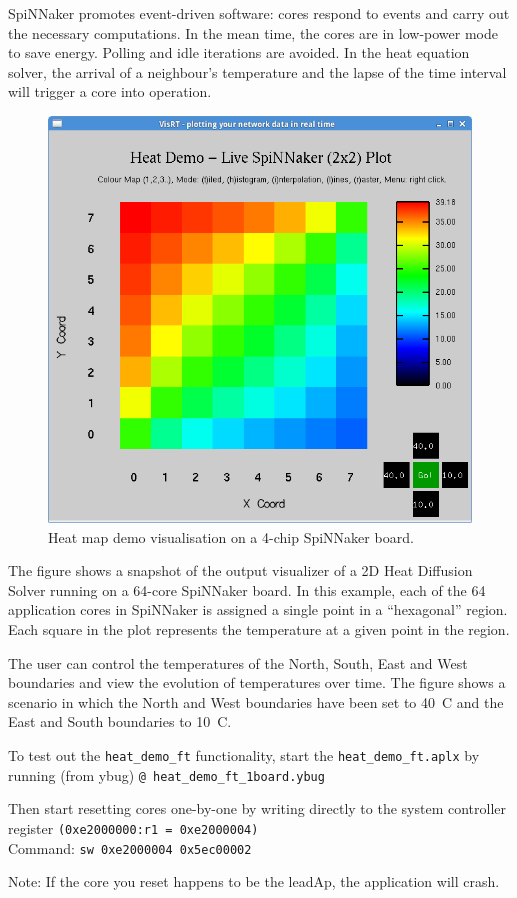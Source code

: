 \documentclass[a4paper, 11pt]{article}
\begin{document}
SpiNNaker promotes event-driven software: cores respond to events and carry out the necessary computations. In the mean time, the cores are in low-power mode to save energy. Polling and idle iterations are avoided. In the heat equation solver, the arrival of a neighbour's temperature and the lapse of the time interval will trigger a core into operation.

\begin{figure}[htbp]
	\centering
	\includegraphics[width=0.6\linewidth]{images/heatmap2x2.png}
	\caption{Heat map demo visualisation on a 4-chip SpiNNaker board.}	
\end{figure}

The figure shows a snapshot of the output visualizer of a 2D Heat Diffusion Solver running on a 64-core SpiNNaker board. In this example, each of the 64 application cores in SpiNNaker is assigned a single point in a ``hexagonal'' region. Each square in the plot represents the temperature at a given point in the region.

The user can control the temperatures of the North, South, East and West boundaries and view the evolution of temperatures over time. The figure shows a scenario in which the North and West boundaries have been set to 40~\textdegree C and the East and South boundaries to 10~\textdegree C.

To test out the \verb|heat_demo_ft| functionality, start the \verb|heat_demo_ft.aplx|
by running (from ybug) \verb|@ heat_demo_ft_1board.ybug|

Then start resetting cores one-by-one by writing directly to the system
controller register \verb|(0xe2000000:r1 = 0xe2000004)|\\
Command: \verb|sw 0xe2000004 0x5ec00002|

Note: If the core you reset happens to be the leadAp, the application will
crash.
\end{document}
